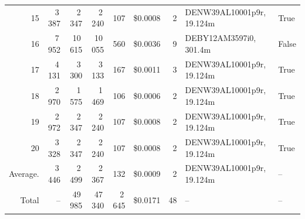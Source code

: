 \documentclass[a4paper,11pt]{article}
\begin{document}
\begin{table}[ht]
\begin{tabular}{r r r r r r r p{3cm} l}
15 & 3\,387 & 2\,347 & 2\,240 & 107 & \$0.0008 & 2 & DENW39AL10001p9r, 19.124m & True \\
16 & 7\,952 & 10\,615 & 10\,055 & 560 & \$0.0036 & 9 & DEBY12AM3597i0, 301.4m & False \\
17 & 4\,131 & 3\,300 & 3\,133 & 167 & \$0.0011 & 3 & DENW39AL10001p9r, 19.124m & True \\
18 & 2\,970 & 1\,575 & 1\,469 & 106 & \$0.0006 & 2 & DENW39AL10001p9r, 19.124m & True \\
19 & 2\,972 & 2\,347 & 2\,240 & 107 & \$0.0008 & 2 & DENW39AL10001p9r, 19.124m & True \\
20 & 3\,328 & 2\,347 & 2\,240 & 107 & \$0.0008 & 2 & DENW39AL10001p9r, 19.124m & True \\
\hline
Average. & 3\,446 & 2\,499 & 2\,367 & 132 & \$0.0009 & 2 & DENW39AL10001p9r, 19.124m & -- \\
Total & -- & 49\,985 & 47\,340 & 2\,645 & \$0.0171 & 48 & -- & -- \\
\hline
\end{tabular}
\end{table}

\clearpage
\end{document}
